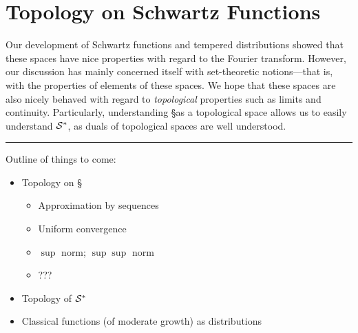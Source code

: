 
  \chapter{Topology on Schwartz Functions}

    \label{ch:topons}
    Our development of Schwartz functions and tempered distributions showed that these spaces have nice properties with regard to the Fourier transform.
    However, our discussion has mainly concerned itself with set-theoretic notions---that is, with the properties of elements of these spaces.
    We hope that these spaces are also nicely behaved with regard to \emph{topological} properties such as limits and continuity.
    Particularly, understanding \S as a topological space allows us to easily understand $\S^*$, as duals of topological spaces are well understood.

    \vspace{24pt}\hrule\vspace{6pt}
    Outline of things to come:
    \begin{itemize}
      \item Topology on \S
        \begin{itemize}
          \item Approximation by sequences
          \item Uniform convergence
          \item $\sup$ norm; $\sup\sup$ norm
          \item ???
        \end{itemize}
      \item Topology of $\S^*$
      \item Classical functions (of moderate growth) as distributions
    \end{itemize}

